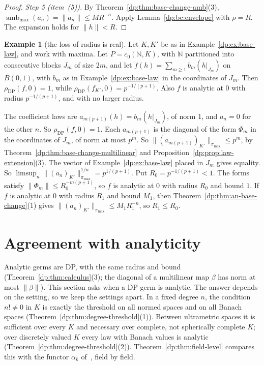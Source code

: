\documentclass[11pt]{amsart}
\theoremstyle{definition}
\theoremstyle{remark}
\numberwithin{equation}{section}
\newcommand{\N}{\mathbb N}
\newcommand{\norm}[1]{\lVert #1\rVert}
\theoremstyle{plain}
\theoremstyle{definition}
\newtheorem{example}[theorem]{Example}
\theoremstyle{plain}
\begin{document}
\begin{proof}
\emph{Step 5 (item~(5)).} By Theorem~\ref{dp:thm:base-change-amb}(3), $\operatorname{amb}_{\max}(a_n)=\norm{a_n}\le MR^{-n}$. Apply Lemma~\ref{dp:bc:envelope} with $\rho=R$. The expansion holds for $\norm h<R$.
\end{proof}

\begin{example}[the loss of radius is real]\label{dp:ex:base-radius}
Let $K,K'$ be as in Example~\ref{dp:ex:base-law}, and work with maxima. Let $P=c_0(\N,K)$, with $\N$ partitioned into consecutive blocks $J_m$ of size $2m$, and let $f(h)=\sum_{m\ge1}b_m(h|_{J_m})$ on $B(0,1)$, with $b_m$ as in Example~\ref{dp:ex:base-law} in the coordinates of $J_m$. Then $\rho_{\mathrm{DP}}(f,0)=1$, while $\rho_{\mathrm{DP}}(f_{K'},0)=p^{-1/(p+1)}$. Also $f$ is analytic at $0$ with radius $p^{-1/(p+1)}$, and with no larger radius.

The coefficient laws are $a_{m(p+1)}(h)=b_m(h|_{J_m})$, of norm $1$, and $a_n=0$ for the other $n$. So $\rho_{\mathrm{DP}}(f,0)=1$. Each $a_{m(p+1)}$ is the diagonal of the form $\Phi_m$ in the coordinates of $J_m$, of norm at most $p^m$. So $\norm{(a_{m(p+1)})_{K'}}_{\pi_{\max}}\le p^m$, by Theorem~\ref{dp:thm:base-change-multilinear} and Proposition~\ref{dp:prop:law-extension}(3). The vector of Example~\ref{dp:ex:base-law} placed in $J_m$ gives equality. So $\limsup_n\norm{(a_n)_{K'}}_{\pi_{\max}}^{1/n}=p^{1/(p+1)}$. Put $R_0=p^{-1/(p+1)}<1$. The forms satisfy $\norm{\Phi_m}\le R_0^{-m(p+1)}$, so $f$ is analytic at $0$ with radius $R_0$ and bound $1$. If $f$ is analytic at $0$ with radius $R_1$ and bound $M_1$, then Theorem~\ref{dp:thm:an-base-change}(1) gives $\norm{(a_n)_{K'}}_{\pi_{\max}}\le M_1R_1^{-n}$, so $R_1\le R_0$.
\end{example}
\section{Agreement with analyticity}\label{dp:sec:agreement}

Analytic germs are DP, with the same radius and bound (Theorem~\ref{dp:thm:calculus}(3); the diagonal of a multilinear map $\beta$ has norm at most $\norm\beta$). This section asks when a DP germ is analytic. The answer depends on the setting, so we keep the settings apart. In a fixed degree $n$, the condition $n!\ne0$ in $K$ is exactly the threshold on all normed spaces and on all Banach spaces (Theorem~\ref{dp:thm:degree-threshold}(1)). Between ultrametric spaces it is sufficient over every $K$ and necessary over complete, not spherically complete $K$; over discretely valued $K$ every law with Banach values is analytic (Theorem~\ref{dp:thm:degree-threshold}(2)). Theorem~\ref{dp:thm:field-level} compares this with the functor $\alpha_k$ of~\cite[n\textsuperscript{o}~7.8.1]{Bou}, field by field.
\end{document}
